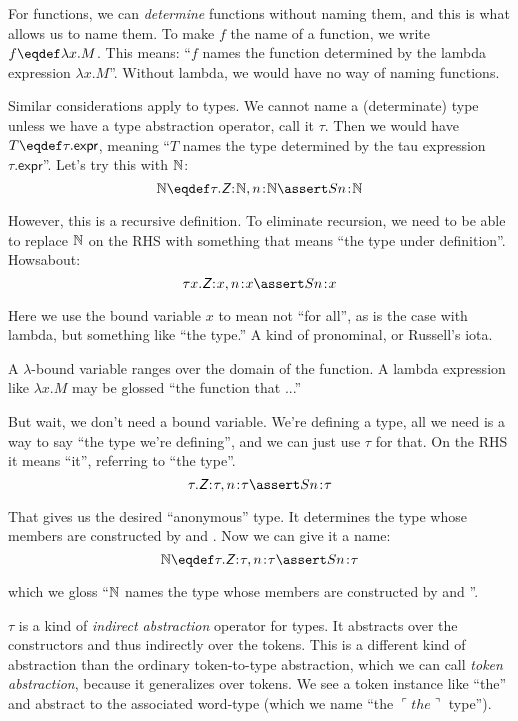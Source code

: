 \documentclass{article}
\begin{document}
For functions, we can \textit{determine} functions without naming
them, and this is what allows us to name them. To make \(f\) the name
of a function, we write \(f\defeq\lambda x.M\). This means: ``\(f\)
names the function determined by the lambda expression \(\lambda
x.M\)''. Without lambda, we would have no way of naming functions.

Similar considerations apply to types. We cannot name a (determinate)
type unless we have a type abstraction operator, call it \(\tau\).
Then we would have \(T\defeq \tau.\textsf{expr}\), meaning ``\(T\)
names the type determined by the tau expression
\(\tau.\textsf{expr}\)''.  Let's try this with \(\mathbb{N}\):
\[\Nat\defeq\tau.\tj{\Znat}{\Nat}, \tj{n}{\Nat}\linfer\tj{Sn}{\Nat}\]

However, this is a recursive definition. To eliminate recursion, we need
to be able to replace \(\mathbb{N}\) on the RHS with something that means
``the type under definition''.  Howsabout:
\[\tau x.\tj{\Znat}{x}, \tj{n}{x}\linfer\tj{Sn}{x}\]

Here we use the bound variable \(x\) to mean not ``for all'', as is
the case with lambda, but something like ``the type.'' A kind of
pronominal, or Russell's iota.

A \(\lambda\)-bound variable ranges over the domain of the function. A
lambda expression like \(\lambda x.M\) may be glossed ``the function
that ...''

But wait, we don't need a bound variable. We're defining a type, all
we need is a way to say ``the type we're defining'', and we can just
use \(\tau\) for that. On the RHS it means ``it'', referring to ``the
type''.
\[\tau.\tj{\Znat}{\tau}, \tj{n}{\tau}\linfer\tj{Sn}{\tau}\]

That gives us the desired ``anonymous'' type. It determines the type
whose members are constructed by \Znat and \Snat. Now we can give it a
name:
\[\Nat\defeq\tau.\tj{\Znat}{\tau}, \tj{n}{\tau}\linfer\tj{Sn}{\tau}\]

which we gloss ``\(\mathbb{N}\) names the type whose members are constructed
by \Znat and \Snat''.

\(\tau\) is a kind of \textit{indirect abstraction} operator for
types. It abstracts over the constructors and thus indirectly over the
tokens. This is a different kind of abstraction than the ordinary
token-to-type abstraction, which we can call \textit{token
  abstraction}, because it generalizes over tokens. We see a token
instance like ``the'' and abstract to the associated word-type (which
we name ``the \(\ulcorner the\urcorner\) type'').
\end{document}
